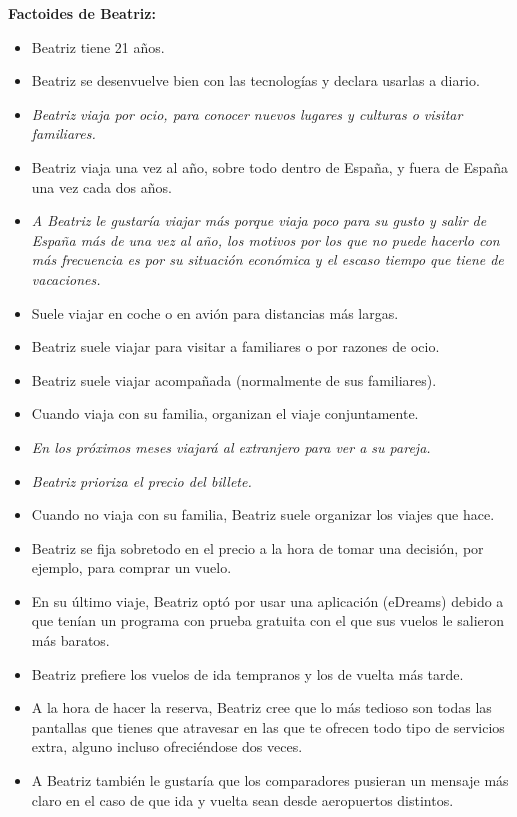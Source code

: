 \textbf{Factoides de Beatriz:}
\begin{itemize}
    \item Beatriz tiene 21 años.
    \item Beatriz se desenvuelve bien con las tecnologías y declara usarlas a diario.
    \item \textit{Beatriz viaja por ocio, para conocer nuevos lugares y culturas o visitar familiares.}
    \item Beatriz viaja una vez al año, sobre todo dentro de España, y fuera de España una vez cada dos años.
    \item \textit{A Beatriz le gustaría viajar más porque viaja poco para su gusto y salir de España más de una vez al año, los motivos por los que no puede hacerlo con más frecuencia es por su situación económica y el escaso tiempo que tiene de vacaciones.}
    \item Suele viajar en coche o en avión para distancias más largas.
    \item Beatriz suele viajar para visitar a familiares o por razones de ocio.
    \item Beatriz suele viajar acompañada (normalmente de sus familiares).
    \item Cuando viaja con su familia, organizan el viaje conjuntamente.
    \item \textit{En los próximos meses viajará al extranjero para ver a su pareja.}
    \item \textit{Beatriz prioriza el precio del billete.}
    \item Cuando no viaja con su familia, Beatriz suele organizar los viajes que hace.
    \item Beatriz se fija sobretodo en el precio a la hora de tomar una decisión, por ejemplo, para comprar un vuelo.
    \item En su último viaje, Beatriz optó por usar una aplicación (eDreams) debido a que tenían un programa con prueba gratuita con el que sus vuelos le salieron más baratos.
    \item Beatriz prefiere los vuelos de ida tempranos y los de vuelta más tarde.
    \item A la hora de hacer la reserva, Beatriz cree que lo más tedioso son todas las pantallas que tienes que atravesar en las que te ofrecen todo tipo de servicios extra, alguno incluso ofreciéndose dos veces.
    \item A Beatriz también le gustaría que los comparadores pusieran un mensaje más claro en el caso de que ida y vuelta sean desde aeropuertos distintos.

\end{itemize}
